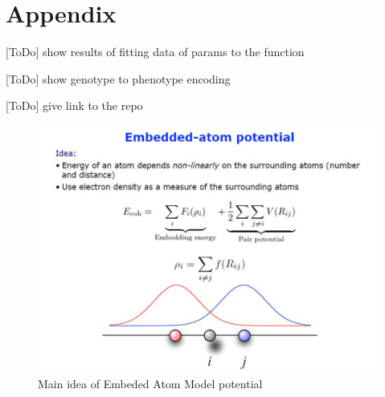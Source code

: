 \documentclass[12pt]{report}
\begin{document}
\goodbreak
\section{Appendix}

[ToDo] show results of fitting data of params to the function

[ToDo] show genotype to phenotype encoding

[ToDo] give link to the repo

\begin{figure}
    \centering
    \includegraphics[width=5.0in]{EAM_appendix}
    \caption{Main idea of Embeded Atom Model potential}
    \label{eamappendix}
\end{figure}
\end{document}
